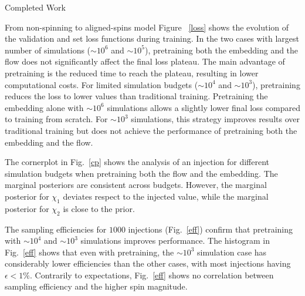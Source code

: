 \documentclass[11pt,a4paper,oneside]{book}
\numberwithin{equation}{chapter}
\numberwithin{table}{chapter}
\numberwithin{figure}{chapter}
\begin{document}
\begin{chapter}{Completed Work}
\begin{section}{From non-spinning to aligned-spins model}
Figure ~\ref{loss} shows the evolution of the validation and set loss functions during training.
In the two cases with largest number of simulations ($\sim 10^{6}$ and $\sim 10^{5}$), pretraining both the embedding and the flow does not significantly affect the final loss plateau. The main advantage of pretraining is the reduced time to reach the plateau, resulting in lower computational costs.
For limited simulation budgets ($\sim 10^{4}$ and $\sim 10^{3}$), pretraining reduces the loss to lower values than traditional training.
Pretraining the embedding alone with $\sim10^{6}$ simulations allows a slightly lower final loss compared to training from scratch.
For $\sim10^{3}$ simulations, this strategy improves results over traditional training but does not achieve the performance of pretraining both the embedding and the flow.

The cornerplot in Fig.~\ref{cp} shows the analysis of an injection for different simulation budgets when pretraining both the flow and the embedding. 
The marginal posteriors are consistent across budgets. However, the marginal posterior for $\chi_{1}$ deviates respect to the injected value, while the marginal posterior for $\chi_{2}$ is close to the prior. 

The sampling efficiencies for $1000$ injections (Fig.~\ref{eff}) confirm that pretraining with $\sim10^{4}$ and  $\sim10^{3}$ simulations improves performance. 
The histogram in Fig.~\ref{eff} shows that even with pretraining, the $\sim10^{3}$ simulation case has considerably lower efficiencies than the other cases, with most injections having $\epsilon<1\%$.
Contrarily to expectations, Fig.~\ref{eff} shows no correlation between sampling efficiency and the higher spin magnitude.










\end{section}
\end{chapter}
\end{document}
